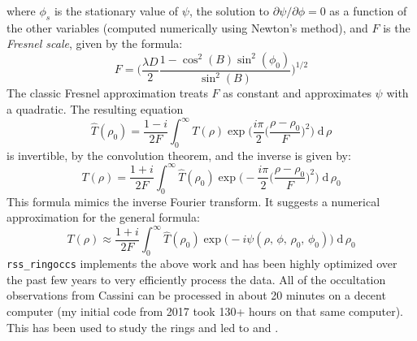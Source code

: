 \documentclass{article}
\theoremstyle{plain}
\begin{document}
            where $\phi_{s}$ is the stationary value of $\psi$, the solution
            to $\partial\psi/\partial\phi=0$ as a function of the other
            variables (computed numerically using Newton's method),
            and $F$ is the \textit{Fresnel scale}, given by the formula:
            \begin{equation}
                F=\Big(
                    \frac{\lambda{D}}{2}
                    \frac{1-\cos^{2}(B)\sin^{2}(\phi_{0})}{\sin^{2}(B)}
                \Big)^{1/2}
            \end{equation}
            The classic Fresnel approximation treats $F$ as constant and
            approximates $\psi$ with a quadratic. The resulting equation
            \begin{equation}
                \hat{T}(\rho_{0})=
                    \frac{1-i}{2F}
                    \int_{0}^{\infty}
                        T(\rho)
                        \exp\Big(\frac{i\pi}{2}
                            \big(\frac{\rho-\rho_{0}}{F}\big)^{2}
                        \Big)\;
                    \textrm{d}\,\rho
            \end{equation}
            is invertible, by the convolution theorem,
            and the inverse is given by:
            \begin{equation}
                T(\rho)=
                    \frac{1+i}{2F}
                    \int_{0}^{\infty}
                        \hat{T}(\rho_{0})
                        \exp\Big(
                            -\frac{i\pi}{2}\big(\frac{\rho-\rho_{0}}{F}\big)^{2}
                        \Big)\;
                    \textrm{d}\,\rho_{0}
            \end{equation}
            This formula mimics the inverse Fourier transform. It suggests a
            numerical approximation for the general formula:
            \begin{equation}
                T(\rho)\approx
                    \frac{1+i}{2F}
                    \int_{0}^{\infty}
                        \hat{T}(\rho_{0})
                        \exp\big(
                            -i\psi(\rho,\,\phi,\,\rho_{0},\,\phi_{0})
                        \big)\;
                    \textrm{d}\,\rho_{0}
            \end{equation}
            \texttt{rss\_ringoccs} implements the above work and has been
            highly optimized over the past few years to very efficiently
            process the data. All of the occultation observations from Cassini
            can be processed in about 20 minutes on a decent computer
            (my initial code from 2017 took 130+ hours on that same computer).
            This has been used to study the rings and led to
            \cite{FRENCH2023115678} and \cite{NICHOLSON2023115287}.
\end{document}
